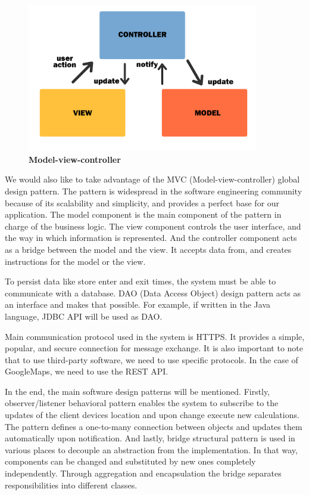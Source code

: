 

\begin{figure}[!h]
\centering
\includegraphics[width=0.9\textwidth]{Images/MVC}
\caption{\label{fig:mvc}\textbf{Model-view-controller}}
\end{figure} \newpage

 

We would also like to take advantage of the MVC (Model-view-controller) global design pattern. The pattern is widespread in the software engineering community because of its scalability and simplicity, and provides a perfect base for our application. The model component is the main component of the pattern in charge of the business logic. The view component controls the user interface, and the way in which information is represented. And the controller component acts as a bridge between the model and the view. It accepts data from, and creates instructions for the model or the view. \newline


To persist data like store enter and exit times, the system must be able to communicate with a database. DAO (Data Access Object) design pattern acts as an interface and makes that possible. For example, if written in the Java language, JDBC API will be used as DAO. 

 

Main communication protocol used in the system is HTTPS. It provides a simple, popular, and secure connection for message exchange. It is also important to note that to use third-party software, we need to use specific protocols. In the case of GoogleMaps, we need to use the REST API. \newline

 

In the end, the main software design patterns will be mentioned. Firstly, observer/listener behavioral pattern enables the system to subscribe to the updates of the client devices location and upon change execute new calculations. The pattern defines a one-to-many connection between objects and updates them automatically upon notification. And lastly, bridge structural pattern is used in various places to decouple an abstraction from the implementation. In that way, components can be changed and substituted by new ones completely independently. Through aggregation and encapsulation the bridge separates responsibilities into different classes. 
\newpage
